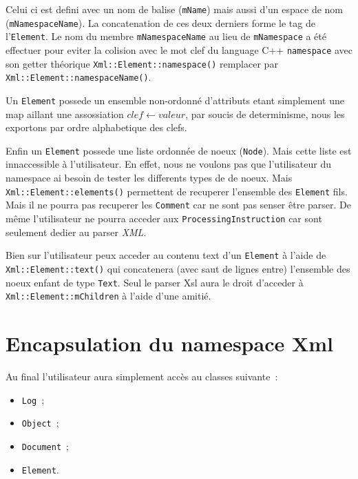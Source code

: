         Celui ci est defini avec un nom de balise (\lstinline$mName$) mais aussi d'un espace de nom (\lstinline$mNamespaceName$). La concatenation de ces deux derniers forme le tag de l'\lstinline$Element$. Le nom du membre \lstinline$mNamespaceName$ au lieu de \lstinline$mNamespace$ a \'et\'e effectuer pour eviter la colision avec le mot clef du language C++ \lstinline$namespace$ avec son getter th\'eorique \lstinline$Xml::Element::namespace()$ remplacer par \lstinline$Xml::Element::namespaceName()$.

        Un \lstinline$Element$ possede un ensemble non-ordonné d'attributs etant simplement une map aillant une assossiation $clef \leftarrow valeur$, par soucis de determinisme, nous les exportons par ordre alphabetique des clefs.

        Enfin un \lstinline$Element$ possede une liste ordonn\'ee de noeux (\lstinline$Node$). Mais cette liste est innaccessible \`a l'utilisateur. En effet, nous ne voulons pas que l'utilisateur du namespace ai besoin de tester les differents types de de noeux. Mais \lstinline$Xml::Element::elements()$ permettent de recuperer
        l'ensemble des \lstinline$Element$ fils. Mais il ne pourra pas recuperer les \lstinline$Comment$ car ne sont pas senser \^etre parser. De m\^eme l'utilisateur ne pourra acceder aux \lstinline$ProcessingInstruction$ car sont seulement dedier au parser \textit{XML}.

        Bien sur l'utilisateur peux acceder au contenu text d'un \lstinline$Element$ \`a l'aide de \lstinline$Xml::Element::text()$ qui concatenera (avec saut de lignes entre) l'ensemble des noeux enfant de type \lstinline$Text$. Seul le parser Xsl aura le droit d'acceder \`a \lstinline$Xml::Element::mChildren$ \`a l'aide d'une amiti\'e.


\section{Encapsulation du namespace Xml}
    Au final l'utilisateur aura simplement acc\`es au classes suivante~:

    \begin{itemize}
        \item \lstinline$Log$~;
        \item \lstinline$Object$~;
        \item \lstinline$Document$~;
        \item \lstinline$Element$.
    \end{itemize}

